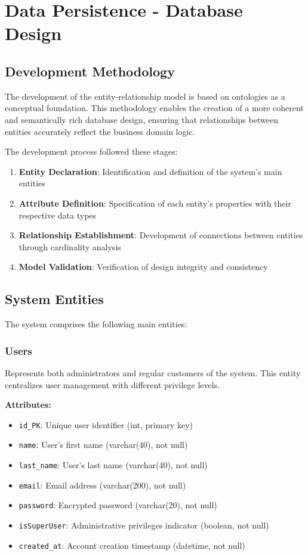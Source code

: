 \documentclass[conference]{IEEEtran}
\begin{document}
    \section{Data Persistence - Database Design}

    \subsection{Development Methodology}
    The development of the entity-relationship model is based on ontologies as a conceptual foundation. This methodology enables the creation of a more coherent and semantically rich database design, ensuring that relationships between entities accurately reflect the business domain logic.

    The development process followed these stages:
    \begin{enumerate}
        \item \textbf{Entity Declaration}: Identification and definition of the system's main entities
        \item \textbf{Attribute Definition}: Specification of each entity's properties with their respective data types
        \item \textbf{Relationship Establishment}: Development of connections between entities through cardinality analysis
        \item \textbf{Model Validation}: Verification of design integrity and consistency
    \end{enumerate}

    \subsection{System Entities}
    The system comprises the following main entities:

    \subsubsection{Users}
    Represents both administrators and regular customers of the system. This entity centralizes user management with different privilege levels.

    \textbf{Attributes:}
    \begin{itemize}
        \item \texttt{id\_PK}: Unique user identifier (int, primary key)
        \item \texttt{name}: User's first name (varchar(40), not null)
        \item \texttt{last\_name}: User's last name (varchar(40), not null)
        \item \texttt{email}: Email address (varchar(200), not null)
        \item \texttt{password}: Encrypted password (varchar(20), not null)
        \item \texttt{isSuperUser}: Administrative privileges indicator (boolean, not null)
        \item \texttt{created\_at}: Account creation timestamp (datetime, not null)
    \end{itemize}
\end{document}
